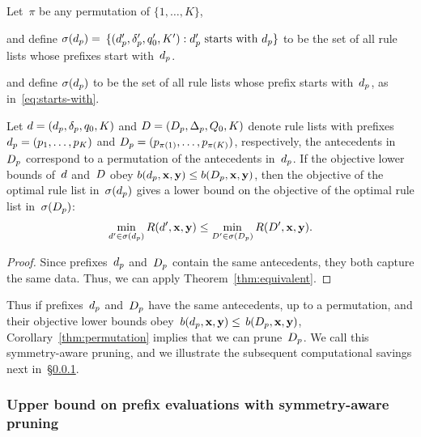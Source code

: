 \begin{corollary}
\label{thm:permutation}
Let~$\pi$ be any permutation of ${\{1, \dots, K\}}$,
\begin{arxiv}
and define ${\sigma(d_p) = }$
${\{(d_p', \delta_p', q_0', K') : d_p' \textnormal{ starts with } d_p \}}$
to be the set of all rule lists whose prefixes start with~$d_p$.
\end{arxiv}
\begin{kdd}
and define $\sigma(d_p)$
to be the set of all rule lists whose prefix starts with~$d_p$,
as in~\eqref{eq:starts-with}.
\end{kdd}
%
Let ${{d} = (d_p, \delta_p, q_0, K)}$
and ${{D} = (D_p, \Delta_p, Q_0, K)}$
denote rule lists with prefixes ${d_p = (p_1, \dots, p_K)}$
and ${D_p = (p_{\pi(1)}, \dots, p_{\pi(K)})}$,
respectively, \ie the antecedents in~$D_p$
correspond to a permutation of the antecedents in~$d_p$.
%
If the objective lower bounds of~${d}$ and~${D}$
obey ${b(d_p, \mathbf{x}, \mathbf{y}) \le b(D_p, \mathbf{x}, \mathbf{y})}$,
then the objective of the optimal rule list in~$\sigma(d_p)$ gives a
lower bound on the objective of the optimal rule list in~$\sigma(D_p)$:
\begin{align}
\min_{{d}' \in \sigma(d_p)} R({d}', \mathbf{x}, \mathbf{y})
\le \min_{{D}' \in \sigma(D_p)} R({D}', \mathbf{x}, \mathbf{y}).
\label{eq:permutation}
\end{align}
\end{corollary}

\begin{arxiv}
\begin{proof}
Since prefixes~$d_p$ and~$D_p$ contain
the same antecedents, they both capture the same data.
Thus, we can apply Theorem~\ref{thm:equivalent}.
\end{proof}
\end{arxiv}

Thus if prefixes~$d_p$ and~$D_p$ have the same antecedents,
up to a permutation, and their objective lower bounds
obey~${b(d_p, \mathbf{x}, \mathbf{y}) \le}$ ${b(D_p, \mathbf{x}, \mathbf{y})}$,
Corollary~\ref{thm:permutation} implies that we can prune~$D_p$.
%
We call this %
symmetry-aware pruning,
and we illustrate the subsequent
computational savings next in~\S\ref{sec:permutation-counting}.

\subsubsection{Upper bound on prefix evaluations with symmetry-aware pruning}
\label{sec:permutation-counting}

